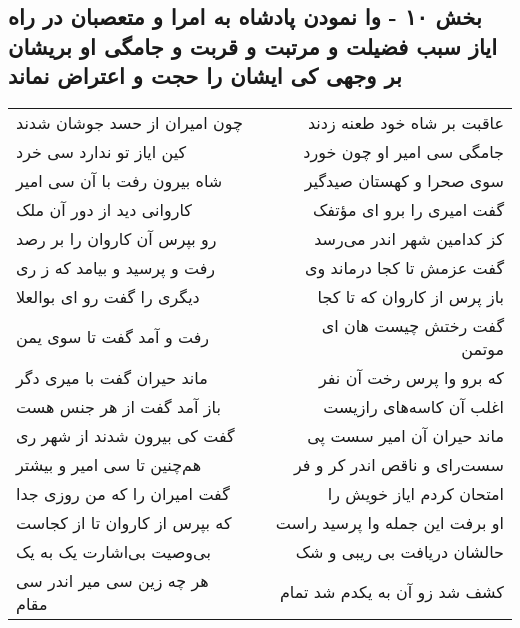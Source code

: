 \begin{center}
\section*{بخش ۱۰ - وا نمودن پادشاه به امرا و متعصبان در راه ایاز سبب فضیلت و مرتبت و قربت و جامگی او بریشان بر وجهی کی ایشان را حجت و اعتراض نماند}
\label{sec:sh010}
\begin{longtable}{l p{0.5cm} r}
چون امیران از حسد جوشان شدند
&&
عاقبت بر شاه خود طعنه زدند
\\
کین ایاز تو ندارد سی خرد
&&
جامگی سی امیر او چون خورد
\\
شاه بیرون رفت با آن سی امیر
&&
سوی صحرا و کهستان صیدگیر
\\
کاروانی دید از دور آن ملک
&&
گفت امیری را برو ای مؤتفک
\\
رو بپرس آن کاروان را بر رصد
&&
کز کدامین شهر اندر می‌رسد
\\
رفت و پرسید و بیامد که ز ری
&&
گفت عزمش تا کجا درماند وی
\\
دیگری را گفت رو ای بوالعلا
&&
باز پرس از کاروان که تا کجا
\\
رفت و آمد گفت تا سوی یمن
&&
گفت رختش چیست هان ای موتمن
\\
ماند حیران گفت با میری دگر
&&
که برو وا پرس رخت آن نفر
\\
باز آمد گفت از هر جنس هست
&&
اغلب آن کاسه‌های رازیست
\\
گفت کی بیرون شدند از شهر ری
&&
ماند حیران آن امیر سست پی
\\
هم‌چنین تا سی امیر و بیشتر
&&
سست‌رای و ناقص اندر کر و فر
\\
گفت امیران را که من روزی جدا
&&
امتحان کردم ایاز خویش را
\\
که بپرس از کاروان تا از کجاست
&&
او برفت این جمله وا پرسید راست
\\
بی‌وصیت بی‌اشارت یک به یک
&&
حالشان دریافت بی ریبی و شک
\\
هر چه زین سی میر اندر سی مقام
&&
کشف شد زو آن به یکدم شد تمام
\\
\end{longtable}
\end{center}

